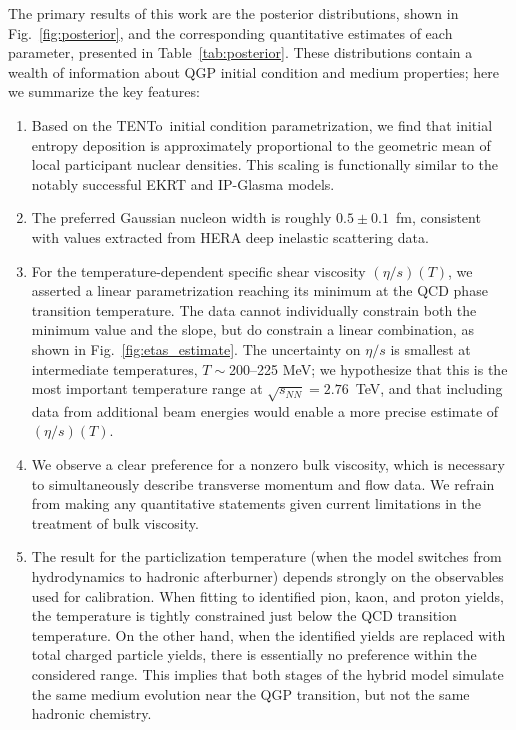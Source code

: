 \documentclass[aps,prc,reprint,amsmath,nofootinbib,noeprint]{revtex4-1}
\newcommand{\trento}{T\raisebox{-0.5ex}{R}ENTo}
\newcommand{\sqrts}{\sqrt{s_{NN}}}
\begin{document}
The primary results of this work are the posterior distributions, shown in Fig.~\ref{fig:posterior}, and the
corresponding quantitative estimates of each parameter, presented in Table~\ref{tab:posterior}.
These distributions contain a wealth of information about QGP initial condition and medium properties; here we summarize the key features:
\begin{enumerate}[itemsep=0pt, leftmargin=2\parindent]
  \item
    Based on the \trento\ initial condition parametrization, we find that initial entropy deposition is approximately proportional to the geometric mean of local participant nuclear densities.
    This scaling is functionally similar to the notably successful EKRT and IP-Glasma models.
  \item
    The preferred Gaussian nucleon width is roughly $0.5 \pm 0.1$~fm, consistent with values extracted from HERA deep inelastic scattering data.
  \item
    For the temperature-dependent specific shear viscosity $(\eta/s)(T)$, we asserted a linear parametrization reaching its minimum at the QCD phase transition temperature.
    The data cannot individually constrain both the minimum value and the slope, but do constrain a linear combination, as shown in Fig.~\ref{fig:etas_estimate}.
    The uncertainty on $\eta/s$ is smallest at intermediate temperatures, $T \sim {}$200--225 MeV;
    we hypothesize that this is the most important temperature range at $\sqrts = 2.76$~TeV,
    and that including data from additional beam energies would enable a more precise estimate of $(\eta/s)(T)$.
  \item
    We observe a clear preference for a nonzero bulk viscosity, which is necessary to simultaneously describe transverse momentum and flow data.
    We refrain from making any quantitative statements given current limitations in the treatment of bulk viscosity.
  \item
    The result for the particlization temperature (when the model switches from hydrodynamics to hadronic afterburner) depends strongly on the observables used for calibration.
    When fitting to identified pion, kaon, and proton yields, the temperature is tightly constrained just below the QCD transition temperature.
    On the other hand, when the identified yields are replaced with total charged particle yields, there is essentially no preference within the considered range.
    This implies that both stages of the hybrid model simulate the same medium evolution near the QGP transition, but not the same hadronic chemistry.
\end{enumerate}
\end{document}
